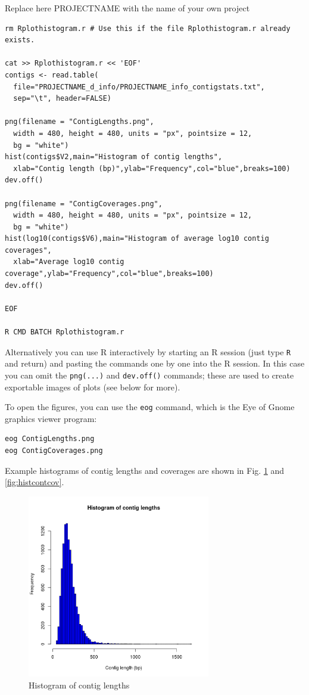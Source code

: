 \documentclass[11pt]{article}
\begin{document}
Replace here PROJECTNAME with the name of your own project
\begin{verbatim}
rm Rplothistogram.r # Use this if the file Rplothistogram.r already exists.

cat >> Rplothistogram.r << 'EOF'
contigs <- read.table(
  file="PROJECTNAME_d_info/PROJECTNAME_info_contigstats.txt", 
  sep="\t", header=FALSE)

png(filename = "ContigLengths.png",
  width = 480, height = 480, units = "px", pointsize = 12,
  bg = "white")
hist(contigs$V2,main="Histogram of contig lengths",
  xlab="Contig length (bp)",ylab="Frequency",col="blue",breaks=100)
dev.off()

png(filename = "ContigCoverages.png",
  width = 480, height = 480, units = "px", pointsize = 12,
  bg = "white")
hist(log10(contigs$V6),main="Histogram of average log10 contig coverages",
  xlab="Average log10 contig coverage",ylab="Frequency",col="blue",breaks=100)
dev.off()

EOF

R CMD BATCH Rplothistogram.r
\end{verbatim}



Alternatively you can use R interactively by starting an R session
(just type \texttt{R} and return) and pasting the commands one by one into the
R session. In this case you can omit the \texttt{png(...)} and \texttt{dev.off()} commands;
these are used to create exportable images of plots (see below for more).

To open the figures, you can use the \texttt{eog} command, which is the
Eye of Gnome graphics viewer program:

\begin{verbatim}
eog ContigLengths.png
eog ContigCoverages.png
\end{verbatim}


Example histograms of contig lengths and coverages are shown in
Fig. \ref{fig:histcontlength} and \ref{fig:histcontcov}.

\clearpage

\begin{figure}[htb]
\centering
\includegraphics[width=8cm]{ContigLengths.png}
\caption{\label{fig:histcontlength}Histogram of contig lengths}
\end{figure}
\end{document}
